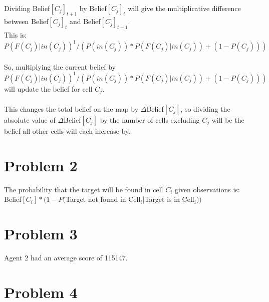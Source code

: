 \documentclass[12pt]{report}
\begin{document}
\\
Dividing Belief$[C_{j}]_{t+1}$ by Belief$[C_{j}]_{t}$ will give the multiplicative difference between Belief$[C_{j}]_{t}$ and Belief$[C_{j}]_{t+1}$.\\
This is: $P(F(C_{j})|in(C_{j}))^{1}/(P(in(C_{j}))*P(F(C_{j})|in(C_{j}))+(1-P(C_{j})))$\\
\\
So, multiplying the current belief by $P(F(C_{j})|in(C_{j}))^{1}/(P(in(C_{j}))*P(F(C_{j})|in(C_{j}))+(1-P(C_{j})))$ will update the belief for cell $C_{j}$.\\
\\
This changes the total belief on the map by $\Delta$Belief$[C_{j}]$, so dividing the absolute value of $\Delta$Belief$[C_{j}]$ by the number of cells excluding $C_{j}$ will be the belief all other cells will each increase by.

\section{Problem 2}
The probability that the target will be found in cell $C_{i}$ given observations is:\\
Belief$[C_{i}]*(1-P($Target not found in Cell$_{i}|$Target is in Cell$_{i}))$

\section{Problem 3}
Agent 2 had an average score of 115147.

\section{Problem 4}
\end{document}

